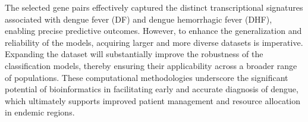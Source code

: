 \documentclass[final]{article}
\begin{document}
The selected gene pairs effectively captured the distinct transcriptional signatures associated with dengue fever (DF) and dengue hemorrhagic fever (DHF), enabling precise predictive outcomes. However, to enhance the generalization and reliability of the models, acquiring larger and more diverse datasets is imperative. Expanding the dataset will substantially improve the robustness of the classification models, thereby ensuring their applicability across a broader range of populations. These computational methodologies underscore the significant potential of bioinformatics in facilitating early and accurate diagnosis of dengue, which ultimately supports improved patient management and resource allocation in endemic regions.


\medskip

{
\small


}
\end{document}
